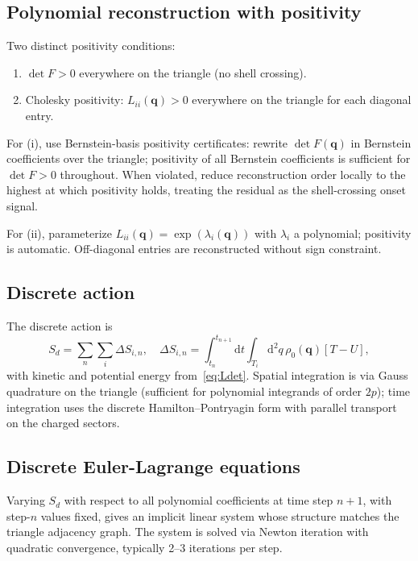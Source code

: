 \documentclass[11pt]{article}
\newcommand{\dd}{\mathrm{d}}
\newcommand{\bq}{\bm{q}}
\begin{document}
\subsection{Polynomial reconstruction with positivity}

Two distinct positivity conditions:
\begin{enumerate}
\item $\det F > 0$ everywhere on the triangle (no shell crossing).
\item Cholesky positivity: $L_{ii}(\bq) > 0$ everywhere on the
triangle for each diagonal entry.
\end{enumerate}

For (i), use Bernstein-basis positivity certificates: rewrite
$\det F(\bq)$ in Bernstein coefficients over the triangle; positivity
of all Bernstein coefficients is sufficient for $\det F > 0$
throughout. When violated, reduce reconstruction order locally to the
highest at which positivity holds, treating the residual as the
shell-crossing onset signal.

For (ii), parameterize $L_{ii}(\bq) = \exp(\lambda_i(\bq))$ with
$\lambda_i$ a polynomial; positivity is automatic. Off-diagonal
entries are reconstructed without sign constraint.

\subsection{Discrete action}

The discrete action is
\begin{equation}
  S_d = \sum_n\sum_i \Delta S_{i,n},\quad
  \Delta S_{i,n} = \int_{t_n}^{t_{n+1}}\dd t\int_{T_i}\dd^2 q\,\rho_0(\bq)[T-U],
\end{equation}
with kinetic and potential energy from~\eqref{eq:Ldet}. Spatial
integration is via Gauss quadrature on the triangle (sufficient for
polynomial integrands of order $2p$); time integration uses the
discrete Hamilton--Pontryagin form with parallel transport on the
charged sectors.

\subsection{Discrete Euler-Lagrange equations}

Varying $S_d$ with respect to all polynomial coefficients at time
step $n+1$, with step-$n$ values fixed, gives an implicit linear
system whose structure matches the triangle adjacency graph. The
system is solved via Newton iteration with quadratic convergence,
typically 2--3 iterations per step.
\end{document}
